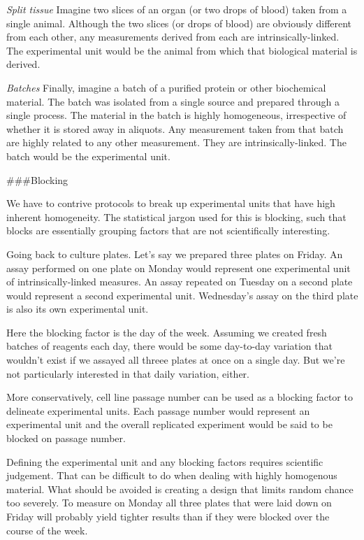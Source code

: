 \documentclass[]{book}
\begin{document}
\emph{Split tissue} Imagine two slices of an organ (or two drops of blood) taken from a single animal. Although the two slices (or drops of blood) are obviously different from each other, any measurements derived from each are intrinsically-linked. The experimental unit would be the animal from which that biological material is derived.

\emph{Batches} Finally, imagine a batch of a purified protein or other biochemical material. The batch was isolated from a single source and prepared through a single process. The material in the batch is highly homogeneous, irrespective of whether it is stored away in aliquots. Any measurement taken from that batch are highly related to any other measurement. They are intrinsically-linked. The batch would be the experimental unit.

\#\#\#Blocking

We have to contrive protocols to break up experimental units that have high inherent homogeneity. The statistical jargon used for this is blocking, such that blocks are essentially grouping factors that are not scientifically interesting.

Going back to culture plates. Let's say we prepared three plates on Friday. An assay performed on one plate on Monday would represent one experimental unit of intrinsically-linked measures. An assay repeated on Tuesday on a second plate would represent a second experimental unit. Wednesday's assay on the third plate is also its own experimental unit.

Here the blocking factor is the day of the week. Assuming we created fresh batches of reagents each day, there would be some day-to-day variation that wouldn't exist if we assayed all threee plates at once on a single day. But we're not particularly interested in that daily variation, either.

More conservatively, cell line passage number can be used as a blocking factor to delineate experimental units. Each passage number would represent an experimental unit and the overall replicated experiment would be said to be blocked on passage number.

Defining the experimental unit and any blocking factors requires scientific judgement. That can be difficult to do when dealing with highly homogenous material. What should be avoided is creating a design that limits random chance too severely. To measure on Monday all three plates that were laid down on Friday will probably yield tighter results than if they were blocked over the course of the week.
\end{document}
